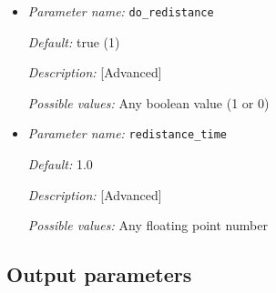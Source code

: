 \begin{itemize}

{\it Default:} 21.0

{\it Description:} [Standard] 

{\it Possible values:} Any floating point number


\item {\it Parameter name:} {\tt do\_redistance}
\label{parameters:do_redistance}


{\it Default:} true (1)

{\it Description:} [Advanced] 

{\it Possible values:} Any boolean value (1 or 0)


\item {\it Parameter name:} {\tt redistance\_time}
\label{parameters:redistance_time}


{\it Default:} 1.0

{\it Description:} [Advanced] 

{\it Possible values:} Any floating point number

\end{itemize}


\subsection{Output parameters}
\label{parameters:output}


